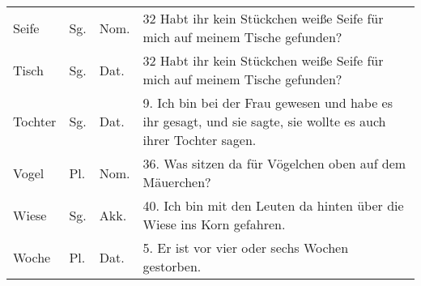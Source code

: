 \begin{xltabular}{\textwidth}{lllQ}
Seife & Sg. & Nom. & 32 Habt ihr kein Stückchen weiße Seife für mich auf meinem Tische gefunden?\\
Tisch & Sg. & Dat. & 32 Habt ihr kein Stückchen weiße Seife für mich auf meinem Tische gefunden?\\
Tochter & Sg. & Dat. & 9. Ich bin bei der Frau gewesen und habe es ihr gesagt, und sie sagte, sie wollte es auch ihrer Tochter sagen.\\
Vogel & Pl. & Nom. & 36. Was sitzen da für Vögelchen oben auf dem Mäuerchen?\\
Wiese & Sg. & Akk. & 40. Ich bin mit den Leuten da hinten über die Wiese ins Korn gefahren.\\
Woche & Pl. & Dat. & 5. Er ist vor vier oder sechs Wochen gestorben.\\
\end{xltabular}
